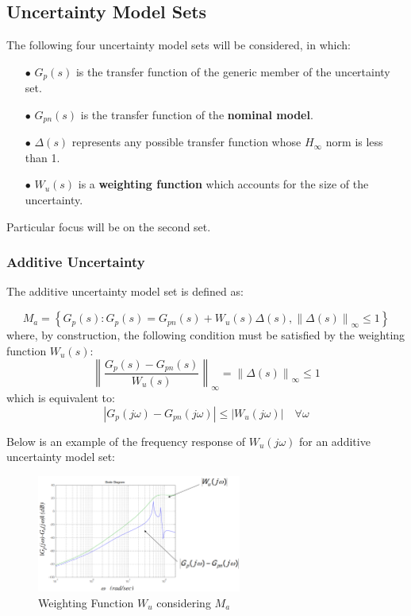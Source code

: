 \documentclass[a4paper,10pt,titlepage]{article}
\numberwithin{equation}{subsection}
\begin{document}
	\subsection{Uncertainty Model Sets}
	The following four uncertainty model sets will be considered, in which:
	\begin{enumerate}
		\item[$\bullet$] $G_p(s) $ is the transfer function of the generic member of the uncertainty set. 
		\item[$\bullet$] $G_{pn}(s)$ is the transfer function of the \textbf{nominal model}.
		\item[$\bullet$] $\Delta(s)$ represents any possible transfer function whose $H_\infty$ norm is less than 1.
		\item[$\bullet$] $W_u(s)$ is a \textbf{weighting function} which accounts for the size of the uncertainty.
	\end{enumerate} 
	Particular focus will be on the second set.
	\subsubsection{Additive Uncertainty}
	The additive uncertainty model set is defined as:
	
	\begin{equation}
		M_a = \left\{ G_p(s): G_p(s)=G_{pn}(s)+W_u(s)\Delta(s), \left\lVert\Delta(s)\right\rVert_\infty \leq1 \right\}
	\end{equation}
	where, by construction, the following condition must be satisfied by the weighting function $W_u(s)$:
	\begin{equation}
		\left\lVert \dfrac{G_p(s)-G_{pn}(s)}{W_u(s)} \right\rVert_\infty = \left\lVert \Delta(s) \right\rVert_\infty \leq 1
	\end{equation}
	which is equivalent to:
	\begin{equation}
		\left| G_p(j\omega)-G_{pn}(j\omega) \right| \leq \left| W_u(j\omega) \right| \quad \forall \omega
	\end{equation}
	
	Below is an example of the frequency response of $W_u(j\omega)$ for an additive uncertainty model set:
	
	\begin{figure}[H] %
		\centering
		\includegraphics[width=0.6\textwidth]{images/additive_uncertainty.png}
		\caption{Weighting Function $W_u$ considering $M_a$}
		\label{fig:image6}
	\end{figure}
	
\end{document}
